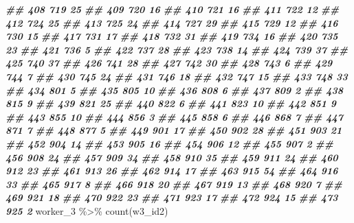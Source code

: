\documentclass[
]{book}
\newenvironment{Shaded}{\begin{snugshade}}{\end{snugshade}}
\newcommand{\DocumentationTok}[1]{\textcolor[rgb]{0.56,0.35,0.01}{\textbf{\textit{#1}}}}
\newcommand{\FunctionTok}[1]{\textcolor[rgb]{0.00,0.00,0.00}{#1}}
\newcommand{\NormalTok}[1]{#1}
\newcommand{\SpecialCharTok}[1]{\textcolor[rgb]{0.00,0.00,0.00}{#1}}
\theoremstyle{definition}
\theoremstyle{definition}
\theoremstyle{definition}
\theoremstyle{definition}
\theoremstyle{remark}
\begin{document}
\begin{Shaded}
\begin{Highlighting}[]
\DocumentationTok{\#\# 408    719 25}
\DocumentationTok{\#\# 409    720 16}
\DocumentationTok{\#\# 410    721 16}
\DocumentationTok{\#\# 411    722 12}
\DocumentationTok{\#\# 412    724 25}
\DocumentationTok{\#\# 413    725 24}
\DocumentationTok{\#\# 414    727 29}
\DocumentationTok{\#\# 415    729 12}
\DocumentationTok{\#\# 416    730 15}
\DocumentationTok{\#\# 417    731 17}
\DocumentationTok{\#\# 418    732 31}
\DocumentationTok{\#\# 419    734 16}
\DocumentationTok{\#\# 420    735 23}
\DocumentationTok{\#\# 421    736  5}
\DocumentationTok{\#\# 422    737 28}
\DocumentationTok{\#\# 423    738 14}
\DocumentationTok{\#\# 424    739 37}
\DocumentationTok{\#\# 425    740 37}
\DocumentationTok{\#\# 426    741 28}
\DocumentationTok{\#\# 427    742 30}
\DocumentationTok{\#\# 428    743  6}
\DocumentationTok{\#\# 429    744  7}
\DocumentationTok{\#\# 430    745 24}
\DocumentationTok{\#\# 431    746 18}
\DocumentationTok{\#\# 432    747 15}
\DocumentationTok{\#\# 433    748 33}
\DocumentationTok{\#\# 434    801  5}
\DocumentationTok{\#\# 435    805 10}
\DocumentationTok{\#\# 436    808  6}
\DocumentationTok{\#\# 437    809  2}
\DocumentationTok{\#\# 438    815  9}
\DocumentationTok{\#\# 439    821 25}
\DocumentationTok{\#\# 440    822  6}
\DocumentationTok{\#\# 441    823 10}
\DocumentationTok{\#\# 442    851  9}
\DocumentationTok{\#\# 443    855 10}
\DocumentationTok{\#\# 444    856  3}
\DocumentationTok{\#\# 445    858  6}
\DocumentationTok{\#\# 446    868  7}
\DocumentationTok{\#\# 447    871  7}
\DocumentationTok{\#\# 448    877  5}
\DocumentationTok{\#\# 449    901 17}
\DocumentationTok{\#\# 450    902 28}
\DocumentationTok{\#\# 451    903 21}
\DocumentationTok{\#\# 452    904 14}
\DocumentationTok{\#\# 453    905 16}
\DocumentationTok{\#\# 454    906 12}
\DocumentationTok{\#\# 455    907  2}
\DocumentationTok{\#\# 456    908 24}
\DocumentationTok{\#\# 457    909 34}
\DocumentationTok{\#\# 458    910 35}
\DocumentationTok{\#\# 459    911 24}
\DocumentationTok{\#\# 460    912 23}
\DocumentationTok{\#\# 461    913 26}
\DocumentationTok{\#\# 462    914 17}
\DocumentationTok{\#\# 463    915 54}
\DocumentationTok{\#\# 464    916 33}
\DocumentationTok{\#\# 465    917  8}
\DocumentationTok{\#\# 466    918 20}
\DocumentationTok{\#\# 467    919 13}
\DocumentationTok{\#\# 468    920  7}
\DocumentationTok{\#\# 469    921 18}
\DocumentationTok{\#\# 470    922 23}
\DocumentationTok{\#\# 471    923 17}
\DocumentationTok{\#\# 472    924 15}
\DocumentationTok{\#\# 473    925  2}
\NormalTok{worker\_3 }\SpecialCharTok{\%\textgreater{}\%} 
  \FunctionTok{count}\NormalTok{(w3\_id2)}

\end{Highlighting}
\end{Shaded}
\end{document}
